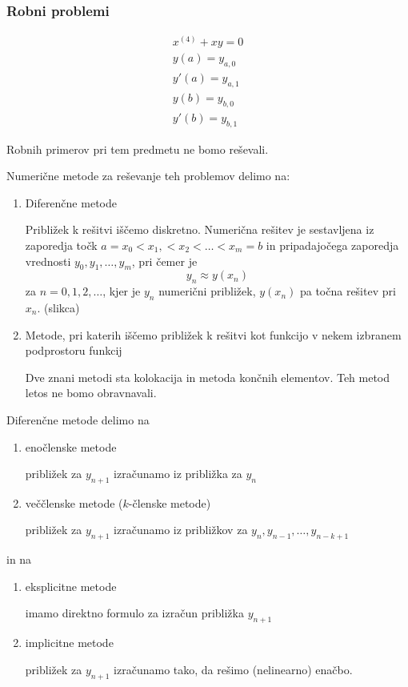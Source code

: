 \documentclass[a4paper,12pt]{article}
\theoremstyle{definition}
\theoremstyle{remark}
\begin{document}
\subsubsection{Robni problemi}

\begin{gather*}
    x^{(4)} + xy = 0 \\
    y(a) = y_{a, 0} \\
    y'(a) = y_{a, 1} \\
    y(b) = y_{b, 0} \\
    y'(b) = y_{b, 1}
\end{gather*}

Robnih primerov pri tem predmetu ne bomo reševali.

Numerične metode za reševanje teh problemov delimo na:

\begin{enumerate}
    \item Diferenčne metode
    
    Približek k rešitvi iščemo diskretno. Numerična rešitev je sestavljena iz zaporedja točk $a = x_0 < x_1, < x_2 < \dots < x_m = b$ in pripadajočega
    zaporedja vrednosti $y_0, y_1, \dots, y_m$, pri čemer je 
    \begin{equation*}
        y_n \approx y(x_n)
    \end{equation*}
    za $n = 0, 1, 2, \dots$, kjer je $y_n$ numerični približek, $y(x_n)$ pa točna rešitev pri $x_n$.
    (slikca)
    \item Metode, pri katerih iščemo približek k rešitvi kot funkcijo v nekem izbranem podprostoru funkcij
    
    Dve znani metodi sta kolokacija in metoda končnih elementov. Teh metod letos ne bomo obravnavali.
\end{enumerate}


Diferenčne metode delimo na
\begin{enumerate}
    \item enočlenske metode
    
    približek za $y_{n+1}$ izračunamo iz približka za $y_n$
    \item veččlenske metode ($k$-členske metode)
    
    približek za $y_{n+1}$ izračunamo iz približkov za $y_n, y_{n-1}, \dots, y_{n-k+1}$
\end{enumerate}
in na
\begin{enumerate}
    \item eksplicitne metode
    
    imamo direktno formulo za izračun približka $y_{n+1}$
    \item implicitne metode
    
    približek za $y_{n+1}$ izračunamo tako, da rešimo (nelinearno) enačbo.
\end{enumerate}
\end{document}
